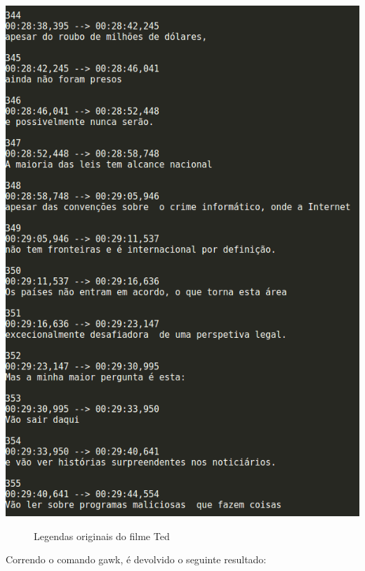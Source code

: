 \documentclass[a4paper]{article}
\begin{document}
\begin{center}
	\includegraphics[scale=0.45]{6}
	\begin{figure}[!h]
	\caption{Legendas originais do filme Ted}
	\end{figure}
\end{center}

\vspace{200px}
Correndo o comando gawk, é devolvido o seguinte resultado:
\end{document}
